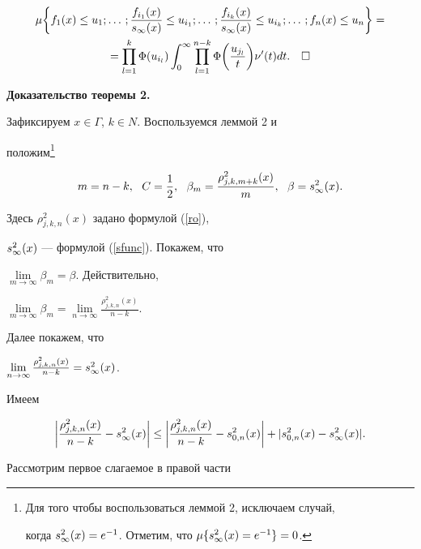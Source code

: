 \begin{multline*}


\mu\bigg\{f_1(x)\le


u_1;\dotsc;\frac{f_{i_1}(x)}{\s}\le u_{i_1};\dotsc;


\frac{f_{i_k}(x)}{\s}\le u_{i_k};


\dotsc;f_n(x)\le u_n\bigg\}=\\


%


=\prod_{l=1}^k\Phi(u_{i_l})\int_0^\infty


\prod_{l=1}^{n-k}\Phi\bigg(\frac{u_{j_l}}{t}\bigg)


\nu'(t)dt.\quad\square


\end{multline*}








{\bf Доказательство теоремы 2.}


Зафиксируем $x\in\Gamma$, $k\in N$. Воспользуемся леммой 2 и 


положим\footnote{Для того чтобы воспользоваться леммой 2, исключаем случай,


когда $s^2_\infty(x)=e^{-1}$. Отметим, что $\mu\{s^2_\infty(x)=e^{-1}\}=0$.}


$$


m=n-k,\ \ C=\frac12,\ \ \beta_m=\frac{\rho^2_{j,k,m+k}(x)}m,\ \ \beta=\stwo.


$$


Здесь $\rho_{j,k,n}^2(x)$ задано формулой (\ref{ro}),


$s^2_\infty(x)$ --- формулой (\ref{sfunc}). Покажем, что


$\lim\limits_{m\to\infty}\beta_m=\beta$. Действительно,


$\lim\limits_{m\to\infty}\beta_m=


\lim\limits_{n\to\infty}\frac{\rho^2_{j,k,n}(x)}{n-k}$.


Далее покажем, что


$\lim\limits_{n\to\infty}\frac{\rho^2_{j,k,n}(x)}{n-k}=s^2_\infty(x)$.


Имеем


$$


\bigg|\frac{\rho^2_{j,k,n}(x)}{n-k}-\stwo\bigg|\le


\bigg|\frac{\rho^2_{j,k,n}(x)}{n-k}-s^2_{0,n}(x)\bigg|+


|s^2_{0,n}(x)-\stwo|.


$$


Рассмотрим первое слагаемое в правой части


